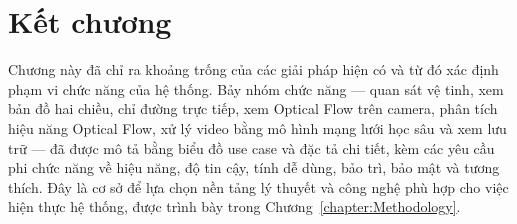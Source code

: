\documentclass[../DoAn.tex]{subfiles}
\begin{document}
\section*{Kết chương}
Chương này đã chỉ ra khoảng trống của các giải pháp hiện có và từ đó xác định phạm vi chức năng của hệ thống. Bảy nhóm chức năng --- quan sát vệ tinh, xem bản đồ hai chiều, chỉ đường trực tiếp, xem Optical Flow trên camera, phân tích hiệu năng Optical Flow, xử lý video bằng mô hình mạng lưới học sâu và xem lưu trữ --- đã được mô tả bằng biểu đồ use case và đặc tả chi tiết, kèm các yêu cầu phi chức năng về hiệu năng, độ tin cậy, tính dễ dùng, bảo trì, bảo mật và tương thích. Đây là cơ sở để lựa chọn nền tảng lý thuyết và công nghệ phù hợp cho việc hiện thực hệ thống, được trình bày trong Chương~\ref{chapter:Methodology}.
\end{document}

